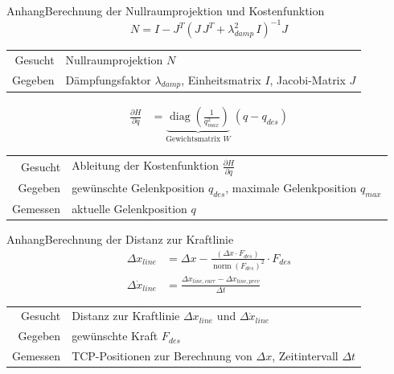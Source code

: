 \documentclass[
  german,            %
  aspectratio=169,    %
]{tumbeamer}
\begin{document}
\begin{frame}{Anhang}{Berechnung der Nullraumprojektion und Kostenfunktion}
  \centering
  \begin{equation}
    N = I - J^T \left( J \, J^T + \lambda_{damp}^2 \, I \right)^{-1} J
  \end{equation}
  \begin{tabular}{r@{: }l}
    Gesucht & Nullraumprojektion $N$ \\
    Gegeben & Dämpfungsfaktor $\lambda_{damp}$, Einheitsmatrix $I$, Jacobi-Matrix $J$
  \end{tabular}
  \begin{align}
    \frac{\partial H}{\partial q} &= \underbrace{\operatorname{diag}\left(\frac{1}{q_{max}^2}\right)}_{\text{Gewichtsmatrix } W} \ (q - q_{des})
  \end{align}
  \begin{tabular}{r@{: }l}
    Gesucht & Ableitung der Kostenfunktion $\frac{\partial H}{\partial q}$ \\
    Gegeben & gewünschte Gelenkposition $q_{des}$, maximale Gelenkposition $q_{max}$ \\
    Gemessen & aktuelle Gelenkposition $q$
  \end{tabular}
\end{frame}

\begin{frame}{Anhang}{Berechnung der Distanz zur Kraftlinie}
  \centering
  \begin{align}
    \Delta x_{line} &= \Delta x - \frac{(\Delta x \cdot F_{des})}{\operatorname{norm}(F_{des})^2} \cdot F_{des} \\
    \Delta \dot{x}_{line} &= \frac{\Delta x_{line, curr} - \Delta x_{line, prev}}{\Delta t}
  \end{align}
  \begin{tabular}{r@{: }l}
    Gesucht & Distanz zur Kraftlinie $\Delta x_{line}$ und $\Delta \dot{x}_{line}$ \\
    Gegeben & gewünschte Kraft $F_{des}$ \\
    Gemessen & TCP-Positionen zur Berechnung von $\Delta x$, Zeitintervall $\Delta t$
  \end{tabular}
\end{frame}
\end{document}

